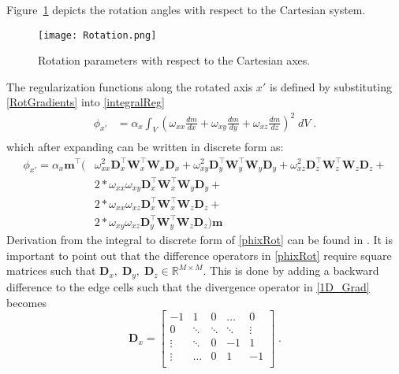 Figure~\ref{Rotation} depicts the rotation angles with respect to the Cartesian system.
\begin{figure}[h!]\centering
\texttt{[image: Rotation.png]}
\caption{Rotation parameters with respect to the Cartesian axes.}
\label{Rotation}
\end{figure}
The regularization functions along the rotated axis $x'$ is defined by substituting \eqref{RotGradients} into \eqref{integralReg}
\begin{equation}
\begin{split}\label{rot2norm}
\phi_{x'} &= \alpha_x \int_V \left( \omega_{xx}\frac{d m}{dx} + \omega_{xy}\frac{d m}{dy} + \omega_{xz}\frac{d m}{dz}\right)^2 \;dV\;. \\
\end{split}
\end{equation}
which after expanding can be written in discrete form as:
\begin{equation}\label{phixRot}
\begin{split}
\phi_{x'} = \alpha_x \mathbf{m}^\top \bigg(&\omega_{xx}^2\mathbf{D}_x^\top\mathbf{W}_x^\top \mathbf{W}_x\mathbf{D}_x + \omega_{xy}^2\mathbf{D}_y^\top\mathbf{W}_y^\top\mathbf{W}_y \mathbf{D}_y + \omega_{xz}^2\mathbf{D}_z^\top\mathbf{W}_z^\top \mathbf{W}_z\mathbf{D}_z +\\
&2*\omega_{xx}\omega_{xy}\mathbf{D}_x^\top \mathbf{W}_x^\top\mathbf{W}_y\mathbf{D}_y +\\
&2*\omega_{xx}\omega_{xz}\mathbf{D}_x^\top \mathbf{W}_x^\top\mathbf{W}_z\mathbf{D}_z +\\
&2*\omega_{xy}\omega_{xz}\mathbf{D}_y^\top \mathbf{W}_y^\top\mathbf{W}_z\mathbf{D}_z \bigg) \mathbf{m}
\end{split}
\end{equation}
Derivation from the integral to discrete form of \eqref{phixRot} can be found in \cite{LiDWO2000}.
It is important to point out that the difference operators in \eqref{phixRot} require square matrices such that $\mathbf{D}_x,\;\mathbf{D}_y,\;\mathbf{D}_z \in \mathbb{R}^{M \times M}$. This is done by adding a backward difference to the edge cells such that the divergence operator in \eqref{1D_Grad} becomes
\begin{equation}\label{1D_GradSquare}
\mathbf{D}_x =
		\begin{bmatrix}
			-1		& 		1	& 	0		& \dots 		& 0 \\
			0 		& 	\ddots	& 	 \ddots	& \ddots 	& \vdots \\
			\vdots	& 		 \ddots	& 0	& -1 & 1\\
			\vdots	& 		 \dots	& 0	& 1 & -1\\
		 \end{bmatrix}\;.
\end{equation}
